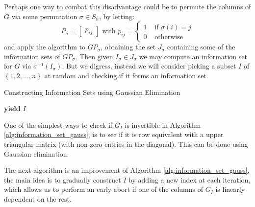 Perhaps one way to combat this disadvantage could be to permute the columns of $G$ via some permutation $\sigma \in S_n$, by letting:
\begin{equation*}
  P_{\sigma} = \begin{bmatrix} p_{ij} \end{bmatrix} \text{ with } p_{ij} = \begin{cases} 1 & \text{ if }  \sigma(i) = j \\ 0 & \text{ otherwise } \end{cases}
\end{equation*}
and apply the algorithm to $GP_{\sigma}$, obtaining the set $J_{\sigma}$ containing some of the information sets of $GP_{\sigma}$. Then given $I_{\sigma} \in J_{\sigma}$ we may compute an information set for $G$ via $\sigma^{-1}(I_{\sigma})$. But we digress, instead we will consider picking a subset $I$ of $\left\{1, 2, \ldots, n\right\}$ at random and checking if it forms an information set.

\begin{algorithm}[H]
\caption{Constructing Information Sets using Gaussian Elimination}\label{alg:information_set_gauss}
\begin{algorithmic}
   
    \State \textbf{yield} $I$
    \EndIf
  \EndFor
  \EndProcedure
\end{algorithmic}
\end{algorithm}
\begin{remark}\label{rem:is_gauss}
  One of the simplest ways to check if $G_I$ is invertible in Algorithm \ref{alg:information_set_gauss}, is to see if it is row equivalent with a upper triangular matrix (with non-zero entries in the diagonal). This can be done using Gaussian elimination.
\end{remark}

The next algorithm is an improvement of Algorithm \ref{alg:information_set_gauss}, the main idea is to gradually construct $I$ by adding a new index at each iteration, which allows us to perform an early abort if one of the columns of $G_I$ is linearly dependent on the rest.

